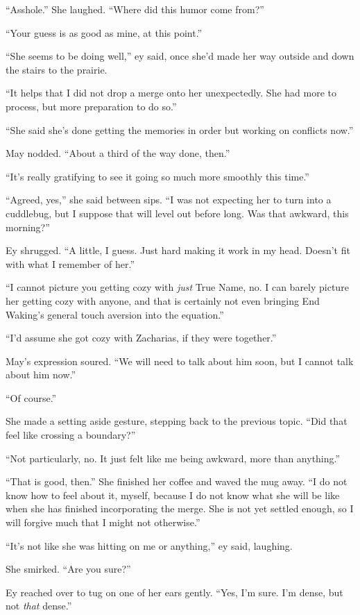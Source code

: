 ``Asshole.'' She laughed. ``Where did this humor come from?''

``Your guess is as good as mine, at this point.''

``She seems to be doing well,'' ey said, once she'd made her way outside and down the stairs to the prairie.

``It helps that I did not drop a merge onto her unexpectedly. She had more to process, but more preparation to do so.''

``She said she's done getting the memories in order but working on conflicts now.''

May nodded. ``About a third of the way done, then.''

``It's really gratifying to see it going so much more smoothly this time.''

``Agreed, yes,'' she said between sips. ``I was not expecting her to turn into a cuddlebug, but I suppose that will level out before long. Was that awkward, this morning?''

Ey shrugged. ``A little, I guess. Just hard making it work in my head. Doesn't fit with what I remember of her.''

``I cannot picture you getting cozy with \emph{just} True Name, no. I can barely picture her getting cozy with anyone, and that is certainly not even bringing End Waking's general touch aversion into the equation.''

``I'd assume she got cozy with Zacharias, if they were together.''

May's expression soured. ``We will need to talk about him soon, but I cannot talk about him now.''

``Of course.''

She made a setting aside gesture, stepping back to the previous topic. ``Did that feel like crossing a boundary?''

``Not particularly, no. It just felt like me being awkward, more than anything.''

``That is good, then.'' She finished her coffee and waved the mug away. ``I do not know how to feel about it, myself, because I do not know what she will be like when she has finished incorporating the merge. She is not yet settled enough, so I will forgive much that I might not otherwise.''

``It's not like she was hitting on me or anything,'' ey said, laughing.

She smirked. ``Are you sure?''

Ey reached over to tug on one of her ears gently. ``Yes, I'm sure. I'm dense, but not \emph{that} dense.''

